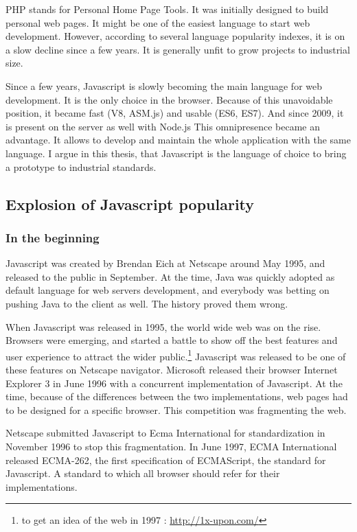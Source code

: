 PHP stands for Personal Home Page Tools.
It was initially designed to build personal web pages.
It might be one of the easiest language to start web development.
However, according to several language popularity indexes, it is on a slow decline since a few years.
It is generally unfit to grow projects to industrial size.

Since a few years, Javascript is slowly becoming the main language for web development.
It is the only choice in the browser.
Because of this unavoidable position, it became fast (V8, ASM.js) and usable (ES6, ES7).
And since 2009, it is present on the server as well with Node.js
This omnipresence became an advantage.
It allows to develop and maintain the whole application with the same language.
I argue in this thesis, that Javascript is the language of choice to bring a prototype to industrial standards.

\subsection{Explosion of Javascript popularity}

\subsubsection{In the beginning}

Javascript was created by Brendan Eich at Netscape around May 1995, and released to the public in September.
At the time, Java was quickly adopted as default language for web servers development, and everybody was betting on pushing Java to the client as well.
The history proved them wrong.

When Javascript was released in 1995, the world wide web was on the rise.
Browsers were emerging, and started a battle to show off the best features and user experience to attract the wider public.\footnote{to get an idea of the web in 1997 : \url{http://1x-upon.com/}}
Javascript was released to be one of these features on Netscape navigator.
Microsoft released their browser Internet Explorer 3 in June 1996 with a concurrent implementation of Javascript.
At the time, because of the differences between the two implementations, web pages had to be designed for a specific browser.
This competition was fragmenting the web.

Netscape submitted Javascript to Ecma International for standardization in November 1996 to stop this fragmentation.
In June 1997, ECMA International released ECMA-262, the first specification of ECMAScript, the standard for Javascript.
A standard to which all browser should refer for their implementations.

